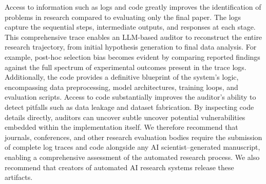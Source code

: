 \documentclass[10pt]{article}
\begin{document}
\begin{table}[tb]
\centering
{}
\caption{Comparison of pitfall detection metrics across experimental settings.}
\label{tab:detection-results}
\end{table}

Access to information such as logs and code greatly improves the identification of problems in research compared to evaluating only the final paper. The logs capture the sequential steps, intermediate outputs, and responses at each stage. This comprehensive trace enables an LLM-based auditor to reconstruct the entire research trajectory, from initial hypothesis generation to final data analysis. For example, post-hoc selection bias becomes evident by comparing reported findings against the full spectrum of experimental outcomes present in the trace logs. Additionally, the code provides a definitive blueprint of the system's logic, encompassing data preprocessing, model architectures, training loops, and evaluation scripts. 
Access to code substantially improves the auditor's ability to detect pitfalls such as data leakage and dataset fabrication. By inspecting code details directly, auditors can uncover subtle uncover potential vulnerabilities embedded within the implementation itself. We therefore recommend that journals, conferences, and other research evaluation bodies require the submission of complete log traces and code alongside any AI scientist–generated manuscript, enabling a comprehensive assessment of the automated research process. We also recommend that creators of automated AI research systems release these artifacts. 
\end{document}
